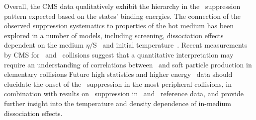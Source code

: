 Overall, the CMS data qualitatively exhibit the hierarchy in the \PgUn\ suppression pattern
expected based on the states' binding energies. The connection of the observed suppression 
systematics to properties of the hot medium has been explored in a number of models,
including screening, dissociation effects dependent on the medium $\eta/$S~\cite{Strickland:2012as} 
and initial temperature~\cite{Ganesh:2014lha}. Recent measurements by CMS for 
\pp\ and \pPb\ collisions suggest that a quantitative interpretation may require an understanding of correlations
between \PgUn\ and soft particle production in elementary collisions \cite{Chatrchyan:2013nza}
Future high statistics and higher energy \PbPb\ data should elucidate the onset of the \PgU\ suppression in the most 
peripheral collisions, in combination with results on \PgU\ suppression in \pp\ and \pPb\ 
reference data, and provide further insight into the temperature and density dependence
of in-medium dissociation effects.
